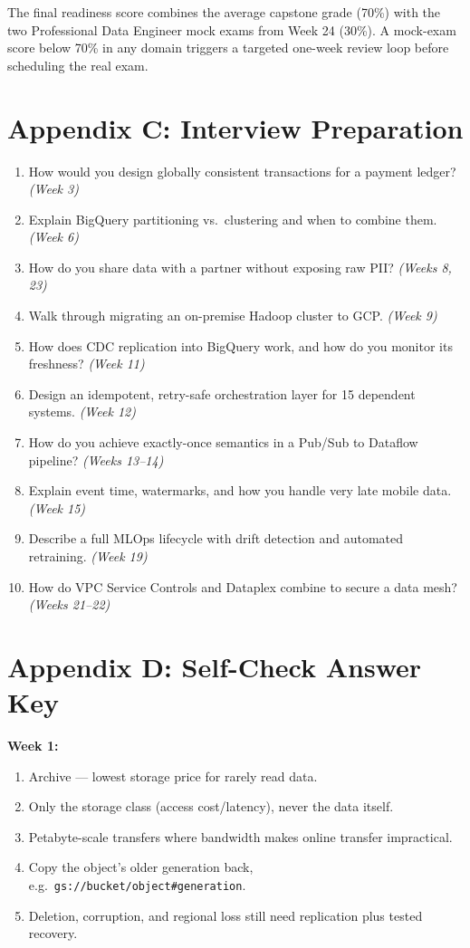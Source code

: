 \documentclass[11pt, a4paper]{article}
\begin{document}
The final readiness score combines the average capstone grade (70\%) with the two Professional Data Engineer mock exams from Week 24 (30\%). A mock-exam score below 70\% in any domain triggers a targeted one-week review loop before scheduling the real exam.

\section{Appendix C: Interview Preparation}
\begin{enumerate}
    \item How would you design globally consistent transactions for a payment ledger? \textit{(Week 3)}
    \item Explain BigQuery partitioning vs.\ clustering and when to combine them. \textit{(Week 6)}
    \item How do you share data with a partner without exposing raw PII? \textit{(Weeks 8, 23)}
    \item Walk through migrating an on-premise Hadoop cluster to GCP. \textit{(Week 9)}
    \item How does CDC replication into BigQuery work, and how do you monitor its freshness? \textit{(Week 11)}
    \item Design an idempotent, retry-safe orchestration layer for 15 dependent systems. \textit{(Week 12)}
    \item How do you achieve exactly-once semantics in a Pub/Sub to Dataflow pipeline? \textit{(Weeks 13--14)}
    \item Explain event time, watermarks, and how you handle very late mobile data. \textit{(Week 15)}
    \item Describe a full MLOps lifecycle with drift detection and automated retraining. \textit{(Week 19)}
    \item How do VPC Service Controls and Dataplex combine to secure a data mesh? \textit{(Weeks 21--22)}
\end{enumerate}

\newpage
\section{Appendix D: Self-Check Answer Key}

\textbf{Week 1:}
\begin{enumerate}[nosep, leftmargin=1.5em]
    \item Archive --- lowest storage price for rarely read data.
    \item Only the storage class (access cost/latency), never the data itself.
    \item Petabyte-scale transfers where bandwidth makes online transfer impractical.
    \item Copy the object's older generation back, e.g.\ \texttt{gs://bucket/object\#generation}.
    \item Deletion, corruption, and regional loss still need replication plus tested recovery.
\end{enumerate}
\end{document}
